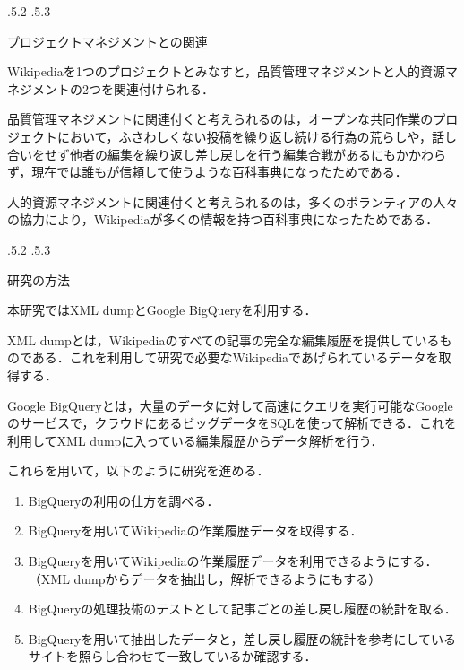 \documentclass[uplatex]{jsarticle}
\makeatletter
\renewcommand{\section}{%
    \if@slide\clearpage\fi
    \@startsection{section}{1}{\z@}%
    {\Cvs \@plus.5\Cdp \@minus.2\Cdp}%
    {.5\Cvs \@plus.3\Cdp}%
    {\normalfont\raggedright}}
\makeatother
\begin{document}
\section{プロジェクトマネジメントとの関連}

Wikipediaを1つのプロジェクトとみなすと，品質管理マネジメントと人的資源マネジメントの2つを関連付けられる\cite{pmbok}．

品質管理マネジメントに関連付くと考えられるのは，オープンな共同作業のプロジェクトにおいて，ふさわしくない投稿を繰り返し続ける行為の荒らしや，話し合いをせず他者の編集を繰り返し差し戻しを行う編集合戦があるにもかかわらず，現在では誰もが信頼して使うような百科事典になったためである．

人的資源マネジメントに関連付くと考えられるのは，多くのボランティアの人々の協力により，Wikipediaが多くの情報を持つ百科事典になったためである．






\section{研究の方法}

本研究ではXML dump\cite{DBdump}とGoogle BigQuery\cite{GBQ}を利用する．

XML dumpとは，Wikipediaのすべての記事の完全な編集履歴を提供しているものである．これを利用して研究で必要なWikipediaであげられているデータを取得する．

Google BigQueryとは，大量のデータに対して高速にクエリを実行可能なGoogleのサービスで，クラウドにあるビッグデータをSQLを使って解析できる．これを利用してXML dumpに入っている編集履歴からデータ解析を行う．

これらを用いて，以下のように研究を進める．

\begin{enumerate}
\item BigQueryの利用の仕方を調べる\cite{WhatGBQ}．

\item BigQueryを用いてWikipediaの作業履歴データを取得する．

\item BigQueryを用いてWikipediaの作業履歴データを利用できるようにする．（XML dumpからデータを抽出し，解析できるようにもする）

\item BigQueryの処理技術のテストとして記事ごとの差し戻し履歴の統計を取る．

\item BigQueryを用いて抽出したデータと，差し戻し履歴の統計を参考にしているサイト\cite{rv}を照らし合わせて一致しているか確認する．
\end{enumerate}
\end{document}

